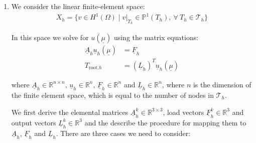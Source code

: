 \begin{enumerate}[label=(\alph*),leftmargin=*,itemsep=0mm]
\begin{proof}
    From Eqns. (10), (12) and (15), we see that $\delta_vJ(u)$ is
    \begin{align*}
        \delta_vJ(u) &= \sum_{i=0}^4 k^i \int_{\Omega^i} \nabla u\nabla v \dd{A}
        + \text{Bi} \int_{\Gamma\setminus\Gamma_\text{root}} uv \dd{S}
        - \int_{\Gamma_\text{root}} v \dd{S} \\
        &= \sum_{i=1}^4 \left( \int_{\Omega^i} \nabla v \cdot \nabla u \dd{A}
        + \text{Bi} \int_{\Gamma^i_\text{ext}} u v \dd{S}\right)
        + \int_{\Omega^0} \nabla v \cdot \nabla u \dd{A}
        + \int_{\Gamma_\text{root}} v \dd{S} \\
        &= 0
    \end{align*}
    
    So Eqn. (15) simplifies to
    \begin{align*}
        J(u+v) &= J(u) + \frac{1}{2} \sum_{i=0}^4 k^i \int_{\Omega^i} (\nabla v)^2 \dd{S} \\
        &\geq J(u)
    \end{align*}
    
    And therefore this means that $u(\underline{\mu})$ is the minimizer of $J(w)$ over all $w \in X$
    
    \end{proof}
    
    \item We consider the linear finite-element space:
    \begin{align*}
        X_h = \{ v\in H^1(\Omega) \mid v|_{T_h} \in \mathbb{P}^1(T_h),\> \forall\> T_h \in \mathcal{T}_h \}
    \end{align*}
    
    In this space we solve for $u(\underline{\mu})$ using the matrix equations:
    \begin{align*}
        \underline{A}_h\underline{u}_h(\underline{\mu}) &= \underline{F}_h \\
        T_{\text{root}.h} &= (\underline{L}_h)^T \underline{u}_h(\underline{\mu})
    \end{align*}
    
    where $\underline{A}_h\in\mathbb{R}^{n\times n}$, $\underline{u}_h\in\mathbb{R}^n$, $\underline{F}_h\in\mathbb{R}^n$ and $\underline{L}_h\in\mathbb{R}^n$, where $n$ is the dimension of the finite element space, which is equal to the number of nodes in $\mathcal{T}_h$.
    
    We first derive the elemental matrices $\underline{A}_h^k\in\mathbb{R}^{3\times 3}$, load vectors $\underline{F}_h^k\in\mathbb{R}^3$ and output vectors $\underline{L}_h^k\in\mathbb{R}^3$ and the describe the procedure for mapping them to $\underline{A}_h$, $\underline{F}_h$ and $\underline{L}_h$.  There are three cases we need to consider:
    

\end{enumerate}
